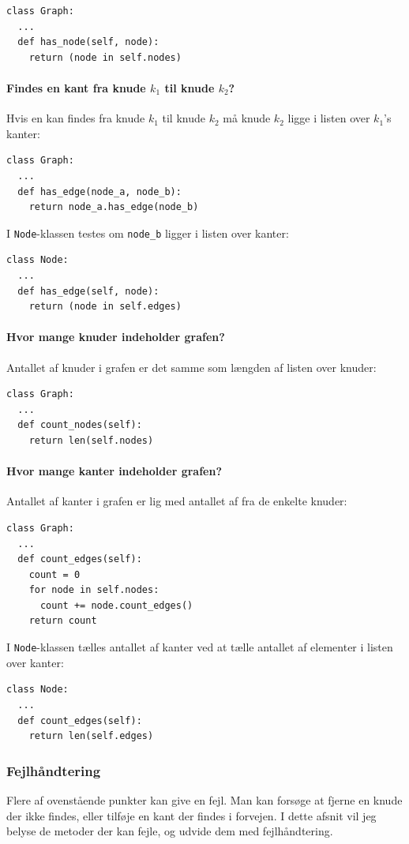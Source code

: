 \documentclass[10pt,a4paper,danish]{article}
\newcommand{\ct}{\texttt}
\begin{document}
{\small
\begin{verbatim}
class Graph:
  ...
  def has_node(self, node):
    return (node in self.nodes)
\end{verbatim}}

\paragraph{Findes en kant fra knude $k_1$ til knude $k_2$?}
Hvis en kan findes fra knude $k_1$ til knude $k_2$ må knude $k_2$
ligge i listen over $k_1$'s kanter:
{\small
\begin{verbatim}
class Graph:
  ...
  def has_edge(node_a, node_b):
    return node_a.has_edge(node_b)
\end{verbatim}}

I \ct{Node}-klassen testes om \ct{node\_b} ligger i listen over kanter:
{\small
\begin{verbatim}
class Node:
  ...
  def has_edge(self, node):
    return (node in self.edges)
\end{verbatim}}

\paragraph{Hvor mange knuder indeholder grafen?}
Antallet af knuder i grafen er det samme som længden af listen over
knuder:
{\small
\begin{verbatim}
class Graph:
  ...
  def count_nodes(self):
    return len(self.nodes)
\end{verbatim}}

\paragraph{Hvor mange kanter indeholder grafen?}
Antallet af kanter i grafen er lig med antallet af fra de enkelte
knuder:
{\small
\begin{verbatim}
class Graph:
  ...
  def count_edges(self):
    count = 0
    for node in self.nodes:
      count += node.count_edges()
    return count
\end{verbatim}}

I \ct{Node}-klassen tælles antallet af kanter ved at tælle antallet af
elementer i listen over kanter:
{\small
\begin{verbatim}
class Node:
  ...
  def count_edges(self):
    return len(self.edges)
\end{verbatim}}


\subsubsection{Fejlhåndtering}
Flere af ovenstående punkter kan give en fejl. Man kan forsøge at
fjerne en knude der ikke findes, eller tilføje en kant der findes i
forvejen. I dette afsnit vil jeg belyse de metoder der kan fejle, og
udvide dem med fejlhåndtering.
\end{document}
